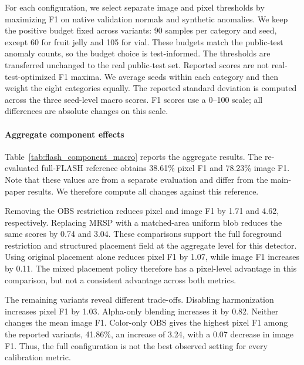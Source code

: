 For each configuration, we select separate image and pixel thresholds by
maximizing F1 on native validation normals and synthetic anomalies.
We keep the positive budget fixed across variants: 90 samples per category and
seed, except 60 for fruit jelly and 105 for vial.
These budgets match the public-test anomaly counts, so the budget choice
is test-informed.
The thresholds are transferred unchanged to the real public-test set.
Reported scores are not real-test-optimized F1 maxima.
We average seeds within each category and then weight the eight
categories equally.
The reported standard deviation is computed across the three seed-level
macro scores.
F1 scores use a 0--100 scale; all differences are absolute changes on this scale.

\paragraph{Aggregate component effects}

Table~\ref{tab:flash_component_macro} reports the aggregate results.
The re-evaluated full-FLASH reference obtains 38.61\% pixel F1 and
78.23\% image F1.
Note that these values are from a separate evaluation and differ from
the main-paper results.
We therefore compute all changes against this reference.

Removing the OBS restriction reduces pixel and image F1 by 1.71 and
4.62, respectively.
Replacing MRSP with a matched-area uniform blob reduces the same scores
by 0.74 and 3.04.
These comparisons support the full foreground restriction and structured
placement field at the aggregate level for this detector.
Using original placement alone reduces pixel F1 by 1.07, while image
F1 increases by 0.11.
The mixed placement policy therefore has a pixel-level advantage in this
comparison, but not a consistent advantage across both metrics.

The remaining variants reveal different trade-offs.
Disabling harmonization increases pixel F1 by 1.03.
Alpha-only blending increases it by 0.82.
Neither changes the mean image F1.
Color-only OBS gives the highest pixel F1 among the reported variants,
41.86\%, an increase of 3.24, with a 0.07 decrease in image F1.
Thus, the full configuration is not the best observed setting for every
calibration metric.

